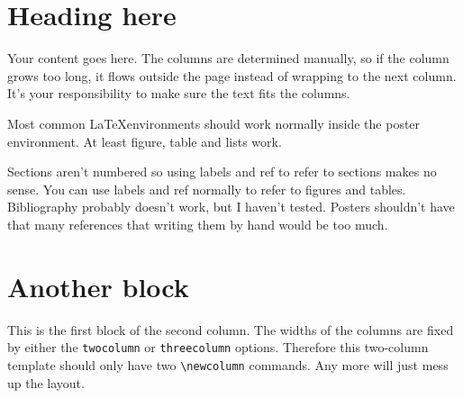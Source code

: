 \documentclass[final]{beamer}
\author{First Author$^1$, \\ Second Author$^2$}
\institute{$^1$Some Institute, \url{email.address@institute}, \\ $^2$Another Institute}
\begin{document}
\begin{poster}

\newcolumn

\section{Heading here}
Your content goes here. The columns are determined manually, so if the column grows too long, it flows outside the page instead of wrapping to the next column. It's your responsibility to make sure the text fits the columns. 

Most common \LaTeX environments should work normally inside the poster environment. At least figure, table and lists work.

Sections aren't numbered so using labels and ref to refer to sections makes no sense. You can use labels and ref normally to refer to figures and tables. Bibliography probably doesn't work, but I haven't tested. Posters shouldn't have that many references that writing them by hand would be too much.


\newcolumn

\section{Another block}
This is the first block of the second column. The widths of the columns are fixed by either the \texttt{twocolumn} or \texttt{threecolumn} options. Therefore this two-column template should only have two \verb+\newcolumn+ commands. Any more will just mess up the layout. 
	

\end{poster}
\end{document}
